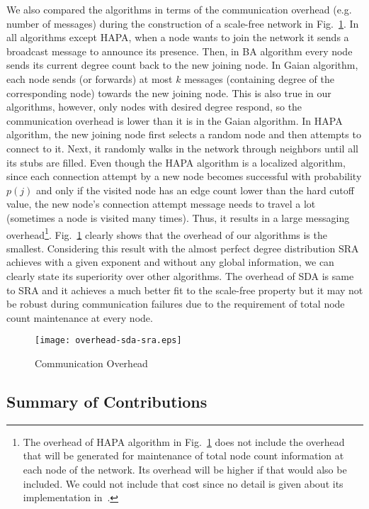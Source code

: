 \documentclass[10pt,journal,cspaper,compsoc]{IEEEtran}
\begin{document}
We also compared the algorithms in terms of the communication overhead (e.g. number of messages) during the construction of a scale-free network in Fig.~\ref{fig:overhead}. In all algorithms except HAPA, when a node wants to join the network it sends a broadcast message to announce its presence. Then, in BA algorithm every node sends its current degree count back to the new joining node. In Gaian algorithm, each node sends (or forwards) at most $k$ messages (containing degree of the corresponding node) towards the new joining node. This is also true in our algorithms, however, only nodes with desired degree respond, so the communication overhead is lower than it is in the Gaian algorithm. In HAPA algorithm, the new joining node first selects a random node and then attempts to connect to it. Next, it randomly walks in the network through neighbors until all its stubs are filled. Even though the HAPA algorithm is a localized algorithm, since each connection attempt by a new node becomes successful with probability $p(j)$ and only if the visited node has an edge count lower than the hard cutoff value, the new node's connection attempt message needs to travel a lot (sometimes a node is visited many times). Thus, it results in a large messaging overhead\footnote{The overhead of HAPA algorithm in Fig.~\ref{fig:overhead} does not include the overhead that will be generated for maintenance of total node count information at each node of the network. Its overhead will be higher if that would also be included. We could not include that cost since no detail is given about its implementation in~\cite{guclu}.}. Fig.~\ref{fig:overhead} clearly shows that the overhead of our algorithms is the smallest. Considering this result with the almost perfect degree distribution SRA achieves with a given exponent and without any global information, we can clearly state its superiority over other algorithms. The overhead of SDA is same to SRA and it achieves a much better fit to the scale-free property but it may not be robust during communication failures due to the requirement of total node count maintenance at every node.

\begin{figure}
\centering
\texttt{[image: overhead-sda-sra.eps]}
\caption{Communication Overhead}
\label{fig:overhead}
\end{figure}



\subsection{Summary of Contributions}
\end{document}
